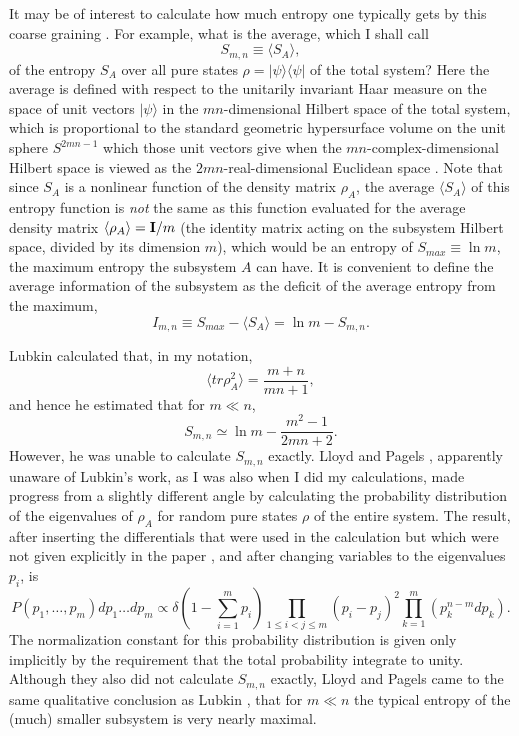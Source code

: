 \documentclass[12pt]{article}
\begin{document}
It may be of interest to calculate how much entropy one typically
gets by this
coarse graining \cite{L1,LP,Pr,P}.  For example, what is the average,
which I
shall call
	\begin{equation}
	S_{m,n} \equiv \langle S_A\rangle,
	\end{equation}
of the entropy $S_A$ over all pure states $\rho =
|\psi\rangle\langle\psi|$ of
the total system?  Here the average is defined with respect to the
unitarily
invariant Haar measure on the space of unit vectors $|\psi\rangle$ in
the
$mn$-dimensional Hilbert space of the total system, which is
proportional to
the standard geometric hypersurface volume on the unit sphere
$S^{2mn-1}$ which
those unit vectors give when the $mn$-complex-dimensional Hilbert
space is
viewed as the $2mn$-real-dimensional Euclidean space \cite{L1}.  Note
that
since $S_A$ is a nonlinear function of the density matrix $\rho_A$,
the average
$\langle S_A\rangle$ of this entropy function is {\it not} the same
as this
function evaluated for the average density matrix
$\langle\rho_A\rangle = {\bf
I}/m$ (the identity matrix acting on the subsystem Hilbert space,
divided by
its dimension $m$), which would be an entropy of $S_{max} \equiv\ln
m$, the
maximum entropy the subsystem $A$ can have.  It is convenient to
define the
average information of the subsystem as the deficit of the average
entropy from
the maximum,
	\begin{equation}
	I_{m,n} \equiv S_{max} - \langle S_A\rangle = \ln m -
S_{m,n}.
	\end{equation}

Lubkin \cite{L1} calculated that, in my notation,
	\begin{equation}
	\langle tr\rho_A^2\rangle = \frac{m+n}{mn+1},
	\end{equation}
and hence he estimated that for $m\ll n$,
	\begin{equation}
	S_{m,n} \simeq \ln m - \frac{m^2-1}{2mn+2}.
	\end{equation}
However, he was unable to calculate $S_{m,n}$ exactly.  Lloyd and
Pagels
\cite{LP}, apparently unaware of Lubkin's work, as I was also when I
did my
calculations, made progress from a slightly different angle by
calculating the
probability distribution of the eigenvalues of $\rho_A$ for random
pure states
$\rho$ of the entire system.  The result, after inserting the
differentials
that were used in the calculation \cite{Lpri} but which were not
given
explicitly in the paper \cite{LP}, and after changing variables to
the
eigenvalues $p_i$, is
	\begin{equation}
	P(p_1,\ldots, p_m)dp_1 \ldots dp_m \propto
	\delta(1-\sum_{i=1}^{m}p_i)
	\prod_{1\leq i<j\leq m} (p_i-p_j)^2
	\prod_{k=1}^{m} (p_k^{n-m}dp_k).
	\end{equation}
The normalization constant for this probability distribution is given
only
implicitly by the requirement that the total probability integrate to
unity.
Although they also did not calculate $S_{m,n}$ exactly, Lloyd and
Pagels
\cite{LP} came to the same qualitative conclusion as Lubkin
\cite{L1}, that for
$m\ll n$ the typical entropy of the (much) smaller subsystem is very
nearly
maximal.
\end{document}
